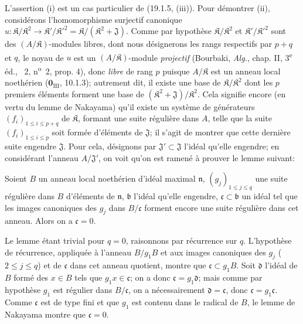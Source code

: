 L'assertion (i) est un cas particulier de (19.1.5, (iii)). Pour démontrer (ii), considérons l'homomorphisme surjectif canonique $u:\mathfrak K/\mathfrak K^2\to\mathfrak K'/\mathfrak K'^2=\mathfrak K/(\mathfrak K^2+\mathfrak J)$. Comme par hypothèse $\mathfrak K/\mathfrak K^2$ et $\mathfrak K'/\mathfrak K'^2$ sont des $(A/\mathfrak K)$-modules libres, dont nous désignerons les rangs respectifs par $p+q$ et $q$, le noyau de $u$ est un $(A/\mathfrak K)$-module \emph{projectif} (Bourbaki, \emph{Alg.}, chap. II, 3\textsuperscript{e} éd., \textsection~2, n\textsuperscript{o}~2, prop. 4), donc \emph{libre} de rang $p$ puisque $A/\mathfrak K$ est un anneau local noethérien ($\mathbf{0}_{\mathrm{III}}$, 10.1.3); autrement dit, il existe une base de $\mathfrak K/\mathfrak K^2$ dont les $p$ premiers éléments forment une base de $(\mathfrak K^2+\mathfrak J)/\mathfrak K^2$. Cela signifie encore (en vertu du lemme de Nakayama) qu'il existe un système de générateurs $(f_i)_{1\leq i\leq p+q}$ de $\mathfrak K$, formant une suite régulière dans $A$, telle que la suite $(f_i)_{1\leq i\leq p}$ soit formée d'éléments de $\mathfrak J$; il s'agit de montrer que cette dernière suite engendre $\mathfrak J$. Pour cela, désignons par $\mathfrak J'\subset\mathfrak J$ l'idéal qu'elle engendre; en considérant l'anneau $A/\mathfrak J'$, on voit qu'on est ramené à prouver le lemme suivant:

\begin{lemma}[19.1.6.1]
\label{IV.19.1.6.1}
Soient $B$ un anneau local noethérien d'idéal maximal $\mathfrak n$, $(g_j)_{1\leq j\leq q}$ une suite régulière dans $B$ d'éléments de $\mathfrak n$, $\mathfrak b$ l'idéal qu'elle engendre, $\mathfrak c\subset\mathfrak b$ un idéal tel que les images canoniques des $g_j$ dans $B/\mathfrak c$ forment encore une suite régulière dans cet anneau. Alors on a $\mathfrak c=0$.
\end{lemma}

Le lemme étant trivial pour $q=0$, raisonnons par récurrence sur $q$. L'hypothèse de récurrence, appliquée à l'anneau $B/g_1B$ et aux images canoniques des $g_j$ ($2\leq j\leq q$)
et de $\mathfrak c$ dans cet anneau quotient, montre que $\mathfrak c\subset g_1B$. Soit $\mathfrak d$ l'idéal de $B$ formé des $x\in B$ tels que $g_1x\in\mathfrak c$; on a donc $\mathfrak c=g_1\mathfrak d$; mais comme par hypothèse $g_1$ est régulier dans $B/\mathfrak c$, on a nécessairement $\mathfrak d=\mathfrak c$, donc $\mathfrak c=g_1\mathfrak c$. Comme $\mathfrak c$ est de type fini et que $g_1$ est contenu dans le radical de $B$, le lemme de Nakayama montre que $\mathfrak c=0$.

